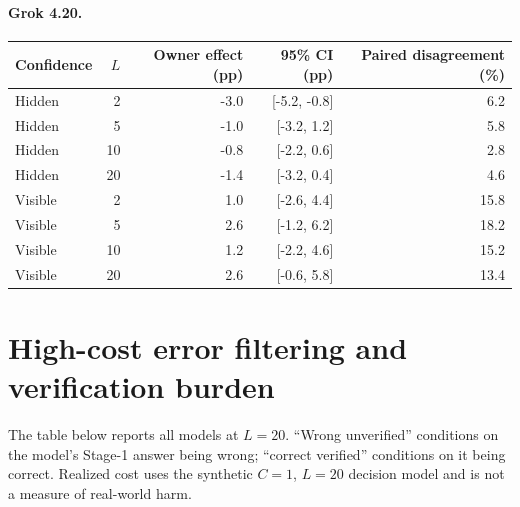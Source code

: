 \paragraph{Grok 4.20.}
\begin{center}
\small
\begin{tabular}{lrrrr}
\toprule
Confidence & $L$ & Owner effect (pp) & 95\% CI (pp) & Paired disagreement (\%) \\
\midrule
Hidden & 2 & -3.0 & [-5.2, -0.8] & 6.2 \\
Hidden & 5 & -1.0 & [-3.2, 1.2] & 5.8 \\
Hidden & 10 & -0.8 & [-2.2, 0.6] & 2.8 \\
Hidden & 20 & -1.4 & [-3.2, 0.4] & 4.6 \\
Visible & 2 & 1.0 & [-2.6, 4.4] & 15.8 \\
Visible & 5 & 2.6 & [-1.2, 6.2] & 18.2 \\
Visible & 10 & 1.2 & [-2.2, 4.6] & 15.2 \\
Visible & 20 & 2.6 & [-0.6, 5.8] & 13.4 \\
\bottomrule
\end{tabular}
\end{center}


\section{High-cost error filtering and verification burden}
\label{app:highcost}

The table below reports all models at $L=20$. ``Wrong unverified'' conditions
on the model's Stage-1 answer being wrong; ``correct verified'' conditions on
it being correct. Realized cost uses the synthetic $C=1$, $L=20$ decision
model and is not a measure of real-world harm.

